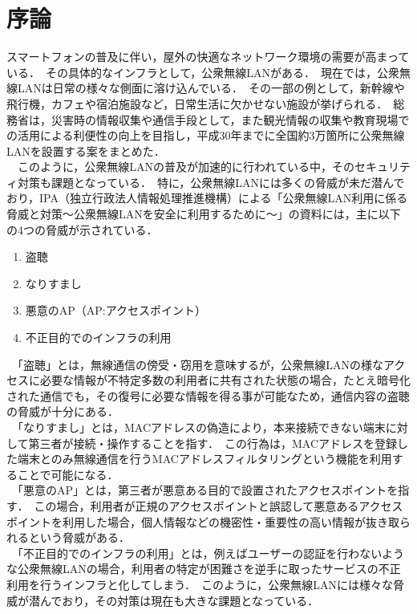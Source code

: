 \documentclass[dvipdfmx]{jsarticle}
\begin{document}
    \section{序論}
        スマートフォンの普及に伴い，屋外の快適なネットワーク環境の需要が高まっている．\
        その具体的なインフラとして，公衆無線LANがある．\
        現在では，公衆無線LANは日常の様々な側面に溶け込んでいる．\
        その一部の例として，新幹線や飛行機，カフェや宿泊施設など，日常生活に欠かせない施設が挙げられる．\
        総務省は，災害時の情報収集や通信手段として，また観光情報の収集や教育現場での活用による利便性の向上を目指し，平成30年までに全国約3万箇所に公衆無線LANを設置する案をまとめた\cite{SoumuWiFi}．\\
        　このように，公衆無線LANの普及が加速的に行われている中，そのセキュリティ対策も課題となっている．\
        特に，公衆無線LANには多くの脅威が未だ潜んでおり，IPA（独立行政法人情報処理推進機構）による「公衆無線LAN利用に係る脅威と対策～公衆無線LANを安全に利用するために～」の資料\cite{IPA}には，主に以下の4つの脅威が示されている．\
        \begin{enumerate}
            \item 盗聴
            \item なりすまし
            \item 悪意のAP（AP:アクセスポイント）
            \item 不正目的でのインフラの利用
        \end{enumerate}
        　「盗聴」とは，無線通信の傍受・窃用を意味するが，公衆無線LANの様なアクセスに必要な情報が不特定多数の利用者に共有された状態の場合，たとえ暗号化された通信でも，その復号に必要な情報を得る事が可能なため，通信内容の盗聴の脅威が十分にある．\\
        　「なりすまし」とは，MACアドレスの偽造により，本来接続できない端末に対して第三者が接続・操作することを指す．\
        この行為は，MACアドレスを登録した端末とのみ無線通信を行うMACアドレスフィルタリングという機能を利用することで可能になる．\\
        　「悪意のAP」とは，第三者が悪意ある目的で設置されたアクセスポイントを指す．\
        この場合，利用者が正規のアクセスポイントと誤認して悪意あるアクセスポイントを利用した場合，個人情報などの機密性・重要性の高い情報が抜き取られるという脅威がある．\\
        　「不正目的でのインフラの利用」とは，例えばユーザーの認証を行わないような公衆無線LANの場合，利用者の特定が困難さを逆手に取ったサービスの不正利用を行うインフラと化してしまう．\
        このように，公衆無線LANには様々な脅威が潜んでおり，その対策は現在も大きな課題となっている．\\
\end{document}

